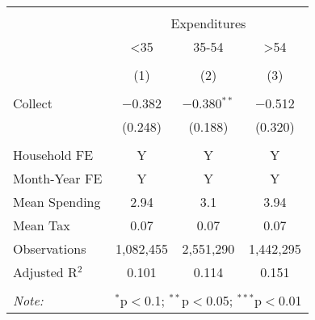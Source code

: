 
\begin{table}[!htbp] \centering 
  \caption{} 
  \label{} 
\begin{tabular}{@{\extracolsep{5pt}}lccc} 
\\[-1.8ex]\hline 
\hline \\[-1.8ex] 
 & \multicolumn{3}{c}{Expenditures} \\ 
\cline{2-4} 
 & <35 & 35-54 & >54 \\ 
\\[-1.8ex] & (1) & (2) & (3)\\ 
\hline \\[-1.8ex] 
 Collect & $-$0.382 & $-$0.380$^{**}$ & $-$0.512 \\ 
  & (0.248) & (0.188) & (0.320) \\ 
 \hline \\[-1.8ex] 
Household FE & Y & Y & Y \\ 
Month-Year FE & Y & Y & Y \\ 
Mean Spending & 2.94 & 3.1 & 3.94 \\ 
Mean Tax & 0.07 & 0.07 & 0.07 \\ 
Observations & 1,082,455 & 2,551,290 & 1,442,295 \\ 
Adjusted R$^{2}$ & 0.101 & 0.114 & 0.151 \\ 
\hline 
\hline \\[-1.8ex] 
\textit{Note:}  & \multicolumn{3}{l}{$^{*}$p$<$0.1; $^{**}$p$<$0.05; $^{***}$p$<$0.01} \\ 
\end{tabular} 
\end{table} 
